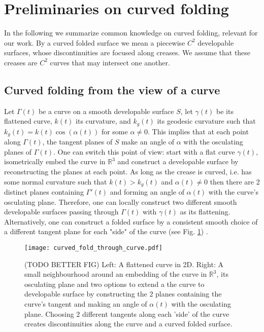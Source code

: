 \section{Preliminaries on curved folding} \label{sec:pre}
In the following we summarize common knowledge on curved folding, relevant for our work. By a curved folded surface we mean a piecewise $C^2$ developable surfaces, whose discontinuities are focused along creases. We assume that these creases are $C^2$ curves that may intersect one another.
\subsection{Curved folding from the view of a curve} \label{sec:curved_folding_from_a_curve}
Let $\Gamma(t)$ be a curve on a smooth developable surface $S$,  let $\gamma(t)$ be its flattened curve, $k(t)$ its curvature, and $k_g(t)$ its geodesic curvature such that $k_g(t) = k(t) \cos(\alpha(t))$ for some $\alpha \neq 0$. This implies that at each point along $\Gamma(t)$, the tangent planes of $S$ make an angle of $\alpha$ with the osculating planes of $\Gamma(t)$. One can switch this point of view: start with a flat curve $\gamma(t)$, isometrically embed the curve in $\mathbb{R}^3$ and construct a developable surface by reconstructing the planes at each point. As long as the crease is curved, i.e. has some normal curvature such that $k(t) > k_g(t)$ and $\alpha(t) \neq 0$ then there are 2 distinct planes containing $\Gamma'(t)$ and forming an angle of $\alpha(t)$ with the curve's osculating plane. Therefore, one can locally construct two different smooth developable surfaces passing through $\Gamma(t)$ with $\gamma(t)$ as its flattening. Alternatively, one can construct a folded surface by a consistent smooth choice of a different tangent plane for each "side" of the curve (see Fig. \ref{fig:curved_fold_through_curve}) \cite{more_on_paper}.

\begin{figure} [h]
	\centering
	\texttt{[image: curved\_fold\_through\_curve.pdf]}
	\caption{(TODO BETTER FIG) Left: A flattened curve in 2D. Right: A small neighbourhood around an embedding of the curve in $\mathbb{R}^3$, its osculating plane and two options to extend a the curve to developable surface by constructing the 2 planes containing the curve's tangent and making an angle of $\alpha(t)$  with the osculating plane. Choosing 2 different tangents along each 'side' of the curve creates discontinuities along the curve and a curved folded surface.}
	\label{fig:curved_fold_through_curve}
\end{figure}

